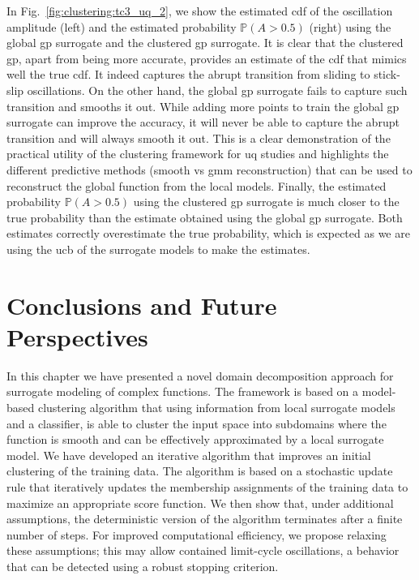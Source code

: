 In Fig.~\ref{fig:clustering:tc3_uq_2}, we show the estimated \gls{cdf} of the oscillation amplitude (left) and the estimated probability $\mathbb{P}(A > 0.5)$ (right) using the global \gls{gp} surrogate and the clustered \gls{gp} surrogate. It is clear that the clustered \gls{gp}, apart from being more accurate, provides an estimate of the \gls{cdf} that mimics well the true \gls{cdf}. It indeed captures the abrupt transition from sliding to stick-slip oscillations. On the other hand, the global \gls{gp} surrogate fails to capture such transition and smooths it out. While adding more points to train the global \gls{gp} surrogate can improve the accuracy, it will never be able to capture the abrupt transition and will always smooth it out. This is a clear demonstration of the practical utility of the clustering framework for \gls{uq} studies and highlights the different predictive methods (smooth vs \gls{gmm} reconstruction) that can be used to reconstruct the global function from the local models. Finally, the estimated probability $\mathbb{P}(A > 0.5)$ using the clustered \gls{gp} surrogate is much closer to the true probability than the estimate obtained using the global \gls{gp} surrogate. Both estimates correctly overestimate the true probability, which is expected as we are using the \gls{ucb} of the surrogate models to make the estimates.




\section{Conclusions and Future Perspectives}
\label{sc:conclusions}

In this chapter we have presented a novel domain decomposition approach for surrogate modeling of complex functions. The framework is based on a model-based clustering algorithm that using information from local surrogate models and a classifier, is able to cluster the input space into subdomains where the function is smooth and can be effectively approximated by a local surrogate model. We have developed an iterative algorithm that improves an initial clustering of the training data. The algorithm is based on a stochastic update rule that iteratively updates the membership assignments of the training data to maximize an appropriate score function. We then show that, under additional assumptions, the deterministic version of the algorithm terminates after a finite number of steps. For improved computational efficiency, we propose relaxing these assumptions; this may allow contained limit-cycle oscillations, a behavior that can be detected using a robust stopping criterion.

